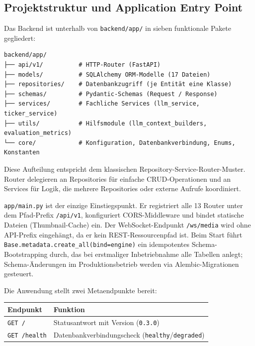 \subsection{Projektstruktur und Application Entry
Point}\label{projektstruktur-und-application-entry-point}

Das Backend ist unterhalb von \texttt{backend/app/} in sieben
funktionale Pakete gegliedert:

\begin{verbatim}
backend/app/
├── api/v1/          # HTTP-Router (FastAPI)
├── models/          # SQLAlchemy ORM-Modelle (17 Dateien)
├── repositories/    # Datenbankzugriff (je Entität eine Klasse)
├── schemas/         # Pydantic-Schemas (Request / Response)
├── services/        # Fachliche Services (llm_service, ticker_service)
├── utils/           # Hilfsmodule (llm_context_builders, evaluation_metrics)
└── core/            # Konfiguration, Datenbankverbindung, Enums, Konstanten
\end{verbatim}

Diese Aufteilung entspricht dem klassischen
Repository-Service-Router-Muster. Router delegieren an Repositories für
einfache CRUD-Operationen und an Services für Logik, die mehrere
Repositories oder externe Aufrufe koordiniert.

\texttt{app/main.py} ist der einzige Einstiegspunkt. Er registriert alle
13 Router unter dem Pfad-Prefix \texttt{/api/v1}, konfiguriert
CORS-Middleware und bindet statische Dateien (Thumbnail-Cache) ein. Der
WebSocket-Endpunkt \texttt{/ws/media} wird ohne API-Prefix eingehängt,
da er kein REST-Ressourcenpfad ist. Beim Start führt
\texttt{Base.metadata.create\_all(bind=engine)} ein idempotentes
Schema-Bootstrapping durch, das bei erstmaliger Inbetriebnahme alle
Tabellen anlegt; Schema-Änderungen im Produktionsbetrieb werden via
Alembic-Migrationen gesteuert.

Die Anwendung stellt zwei Metaendpunkte bereit:

{\def\LTcaptype{none} %
\begin{longtable}[]{@{}ll@{}}
\toprule\noalign{}
Endpunkt & Funktion \\
\midrule\noalign{}
\endhead
\bottomrule\noalign{}
\endlastfoot
\texttt{GET\ /} & Statusantwort mit Version (\texttt{0.3.0}) \\
\texttt{GET\ /health} & Datenbankverbindungscheck
(\texttt{healthy}/\texttt{degraded}) \\
\end{longtable}
}

